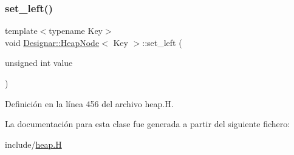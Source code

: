 \subsubsection{\texorpdfstring{set\+\_\+left()}{set\_left()}}
{\footnotesize\ttfamily template$<$typename Key$>$ \\
void \hyperlink{class_designar_1_1_heap_node}{Designar\+::\+Heap\+Node}$<$ Key $>$\+::set\+\_\+left (\begin{DoxyParamCaption}\item[{unsigned int}]{value }\end{DoxyParamCaption})\hspace{0.3cm}{\ttfamily [inline]}}



Definición en la línea 456 del archivo heap.\+H.



La documentación para esta clase fue generada a partir del siguiente fichero\+:\begin{DoxyCompactItemize}
\item 
include/\hyperlink{heap_8_h}{heap.\+H}\end{DoxyCompactItemize}
